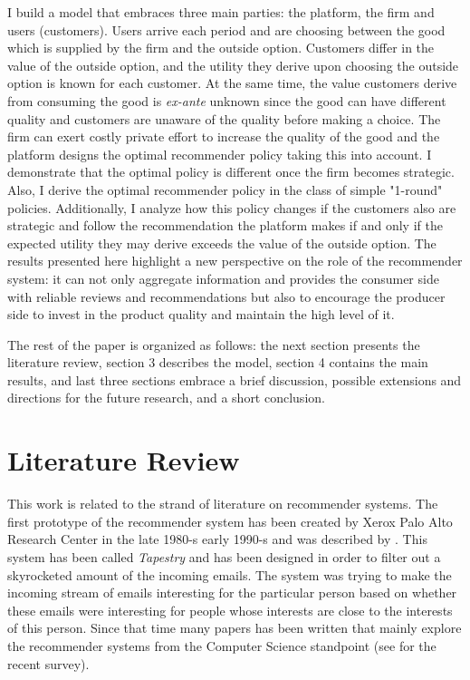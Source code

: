 \documentclass[a4paper]{article}
\begin{document}
	
	
	
	I build a model that embraces three main parties: the platform, the firm and users (customers). Users arrive each period and are choosing between the good which is supplied by the firm and the outside option. Customers differ in the value of the outside option, and the utility they derive upon choosing the outside option is known for each customer. At the same time, the value customers derive from consuming the good is \textit{ex-ante} unknown since the good can have different quality and customers are unaware of the quality before making a choice. The firm can exert costly private effort to increase the quality of the good and the platform designs the optimal recommender policy taking this into account. I demonstrate that the optimal policy is different once the firm becomes strategic. Also, I derive the optimal recommender policy in the class of simple "1-round" policies. Additionally, I analyze how this policy changes if the customers also are strategic and follow the recommendation the platform makes if and only if the expected utility they may derive exceeds the value of the outside option. The results presented here highlight a new perspective on the role of the recommender system: it can not only aggregate information and provides the consumer side with reliable reviews and recommendations but also to encourage the producer side to invest in the product quality and maintain the high level of it.
	
	
	
	
	The rest of the paper is organized as follows: the next section presents the literature review, section 3 describes the model, section 4 contains the main results, and last three sections embrace a brief discussion, possible extensions and directions for the future research, and a short conclusion.
	\section{Literature Review}
	This work is related to the strand of literature on recommender systems. The first prototype of the recommender system has been created by Xerox Palo Alto Research Center in the late 1980-s early 1990-s and was described by  \cite{goldberg1992using}. This system has been called \textit{Tapestry} and has been designed in order to filter out a skyrocketed amount of the incoming emails. The system was trying to make the incoming stream of emails interesting for the particular person based on whether these emails were interesting for people whose interests are close to the interests of this person. Since that time many papers has been written that mainly explore the recommender systems from the Computer Science standpoint (see \cite{Beel2015r} for the recent survey). 
	
\end{document}
